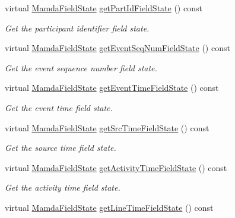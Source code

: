 \begin{CompactItemize}
virtual \hyperlink{namespaceWombat_93aac974f2ab713554fd12a1fa3b7d2a}{Mamda\-Field\-State} \hyperlink{classWombat_1_1MamdaConcreteBasicEvent_8e848f2a327a657f8879ae6a53ee896d}{get\-Part\-Id\-Field\-State} () const 
\begin{CompactList}\small\item\em Get the participant identifier field state. \item\end{CompactList}\item 
virtual \hyperlink{namespaceWombat_93aac974f2ab713554fd12a1fa3b7d2a}{Mamda\-Field\-State} \hyperlink{classWombat_1_1MamdaConcreteBasicEvent_295b7ceae0675c43a374d2b38a41ffd2}{get\-Event\-Seq\-Num\-Field\-State} () const 
\begin{CompactList}\small\item\em Get the event sequence number field state. \item\end{CompactList}\item 
virtual \hyperlink{namespaceWombat_93aac974f2ab713554fd12a1fa3b7d2a}{Mamda\-Field\-State} \hyperlink{classWombat_1_1MamdaConcreteBasicEvent_9c45716bd83bba7832a3651bda399443}{get\-Event\-Time\-Field\-State} () const 
\begin{CompactList}\small\item\em Get the event time field state. \item\end{CompactList}\item 
virtual \hyperlink{namespaceWombat_93aac974f2ab713554fd12a1fa3b7d2a}{Mamda\-Field\-State} \hyperlink{classWombat_1_1MamdaConcreteBasicEvent_cf84914b1c21f84fc7488a2b385816a6}{get\-Src\-Time\-Field\-State} () const 
\begin{CompactList}\small\item\em Get the source time field state. \item\end{CompactList}\item 
virtual \hyperlink{namespaceWombat_93aac974f2ab713554fd12a1fa3b7d2a}{Mamda\-Field\-State} \hyperlink{classWombat_1_1MamdaConcreteBasicEvent_d2ffaf16878c95e6740e7b3f77f1bb4e}{get\-Activity\-Time\-Field\-State} () const 
\begin{CompactList}\small\item\em Get the activity time field state. \item\end{CompactList}\item 
virtual \hyperlink{namespaceWombat_93aac974f2ab713554fd12a1fa3b7d2a}{Mamda\-Field\-State} \hyperlink{classWombat_1_1MamdaConcreteBasicEvent_8f501fe426d7cff7486834d8fbafa2d6}{get\-Line\-Time\-Field\-State} () const 

\end{CompactItemize}
